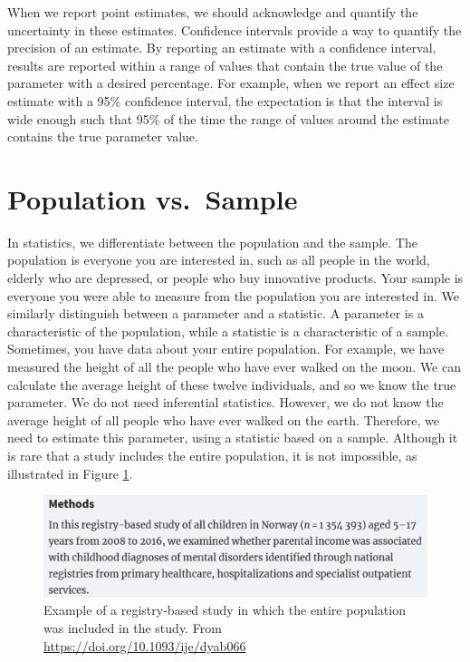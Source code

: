 \documentclass[
  oneside]{krantz}
\begin{document}
When we report point estimates, we should acknowledge and quantify the uncertainty in these estimates. Confidence intervals provide a way to quantify the precision of an estimate. By reporting an estimate with a confidence interval, results are reported within a range of values that contain the true value of the parameter with a desired percentage. For example, when we report an effect size estimate with a 95\% confidence interval, the expectation is that the interval is wide enough such that 95\% of the time the range of values around the estimate contains the true parameter value.

\hypertarget{population-vs.-sample}{%
\section{Population vs.~Sample}\label{population-vs.-sample}}

In statistics, we differentiate between the population and the sample. The population is everyone you are interested in, such as all people in the world, elderly who are depressed, or people who buy innovative products. Your sample is everyone you were able to measure from the population you are interested in. We similarly distinguish between a parameter and a statistic. A parameter is a characteristic of the population, while a statistic is a characteristic of a sample. Sometimes, you have data about your entire population. For example, we have measured the height of all the people who have ever walked on the moon. We can calculate the average height of these twelve individuals, and so we know the true parameter. We do not need inferential statistics. However, we do not know the average height of all people who have ever walked on the earth. Therefore, we need to estimate this parameter, using a statistic based on a sample. Although it is rare that a study includes the entire population, it is not impossible, as illustrated in Figure \ref{fig:population}.



\begin{figure}

{\centering \includegraphics[width=1\linewidth]{images/population} 

}

\caption{Example of a registry-based study in which the entire population was included in the study. From \url{https://doi.org/10.1093/ije/dyab066}}\label{fig:population}
\end{figure}
\end{document}
